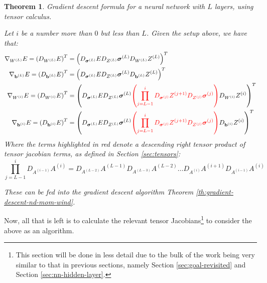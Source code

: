 \documentclass[a4paper]{article}
\theoremstyle{plain} %
\newtheorem{theorem}{Theorem}[section]
\theoremstyle{definition} %
\numberwithin{equation}{subsection}
\newcommand{\vb}{{\textbf{b}}}
\newcommand{\vsigma}{{\bm{\sigma}}} %
\begin{document}
\begin{theorem} \label{th:tensor-nn-L-layer}
  Gradient descent formula for a neural network with $L$ layers, using tensor calculus.

  Let $i$ be a number more than $0$ but less than $L$. Given the setup above, we have that:
\begin{align*}
  \nabla_{W^{(L)}}E = \left(D_{W^{(L)}}E\right)^T &= \left(D_{\vsigma^{(L)}}E D_{Z^{(L)}}\vsigma^{(L)} D_{W^{(L)}}Z^{(L)}\right)^T \\
  \nabla_{\vb^{(L)}}E = \left(D_{\vb^{(L)}}E\right)^T &= \left(D_{\vsigma^{(L)}}E D_{Z^{(L)}}\vsigma^{(L)} D_{\vb^{(L)}}Z^{(L)}\right)^T \\
  \nabla_{W^{(i)}}E = \left(D_{W^{(i)}}E\right)^T &= \left(D_{\vsigma^{(L)}}E D_{Z^{(L)}}\vsigma^{(L)} 
  \textcolor{red}{
    \left(\prod_{j = L-1}^{i}D_{\vsigma^{(j)}}Z^{(j+1)} D_{Z^{(j)}} \vsigma^{(j)}\right)
    }
  D_{W^{(i)}}Z^{(i)}\right)^T \\
  \nabla_{\vb^{(i)}}E = \left(D_{\vb^{(i)}}E\right)^T &= \left(D_{\vsigma^{(L)}}E D_{Z^{(L)}}\vsigma^{(L)} 
  \textcolor{red}{
    \left(\prod_{j = L-1}^{i}D_{\vsigma^{(j)}}Z^{(j+1)} D_{Z^{(j)}} \vsigma^{(j)}\right)
    } 
  D_{\vb^{(i)}}Z^{(i)}\right)^T 
\end{align*} 
  Where the terms highlighted in red denote a descending right tensor product of tensor jacobian terms, as defined in Section \ref{sec:tensors}:
  \[
  \prod_{j=L-1}^{i} D_{A^{(i-1)}}A^{(i)} = D_{A^{(L-2)}}A^{(L-1)}D_{A^{(L-3)}}A^{(L-2)}\dots D_{A^{(i)}}A^{(i+1)} D_{A^{(i-1)}}A^{(i)}
  \]


  These can be fed into the gradient descent algorithm Theorem \ref{th:gradient-descent-nd-mom-wind}.
\end{theorem}

Now, all that is left is to calculate the relevant tensor Jacobians\footnote{This section will be done in less detail due to the bulk of the work being very similar to that in previous sections, namely Section \ref{sec:goal-revisited} and Section \ref{sec:nn-hidden-layer}.} to consider the above as an algorithm.
\end{document}
